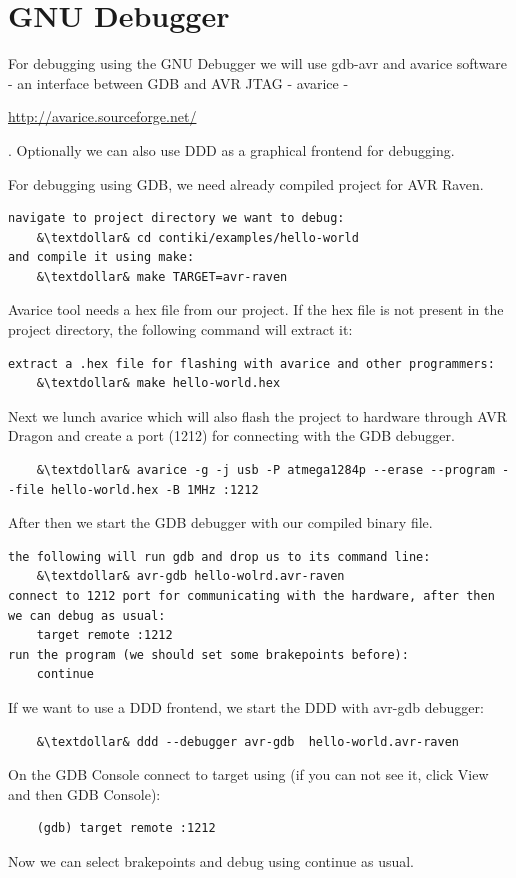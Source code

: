 \documentclass{article}
\begin{document}
\section{GNU Debugger}
For debugging using the GNU Debugger we will use gdb-avr and avarice software -
an interface between GDB and AVR JTAG - avarice - {\url{http://avarice.sourceforge.net/}{.
Optionally we can also use DDD as a graphical frontend for debugging.

For debugging using GDB, we need already compiled project for AVR Raven.
\begin{lstlisting}
navigate to project directory we want to debug:
	&\textdollar& cd contiki/examples/hello-world
and compile it using make:
	&\textdollar& make TARGET=avr-raven
\end{lstlisting}
Avarice tool needs a hex file from our project.
If the hex file is not present in the project directory, the following command will extract it:
\begin{lstlisting}
extract a .hex file for flashing with avarice and other programmers:
	&\textdollar& make hello-world.hex
\end{lstlisting}

Next we lunch avarice which will also flash the project to hardware
through AVR Dragon and
create a port (1212) for connecting with the GDB debugger.
\begin{lstlisting}
	&\textdollar& avarice -g -j usb -P atmega1284p --erase --program --file hello-world.hex -B 1MHz :1212
\end{lstlisting}
After then we start the GDB debugger with our compiled binary file.
\begin{lstlisting}
the following will run gdb and drop us to its command line:
	&\textdollar& avr-gdb hello-wolrd.avr-raven
connect to 1212 port for communicating with the hardware, after then we can debug as usual:
	target remote :1212
run the program (we should set some brakepoints before):
	continue
\end{lstlisting}
If we want to use a DDD frontend, we start the DDD with avr-gdb debugger:
\begin{lstlisting}
	&\textdollar& ddd --debugger avr-gdb  hello-world.avr-raven
\end{lstlisting}
On the GDB Console connect to target using (if you can not see it, click View and then GDB Console):
\begin{lstlisting}
	(gdb) target remote :1212
\end{lstlisting}
Now we can select brakepoints and debug using continue as usual.

}}
\end{document}
